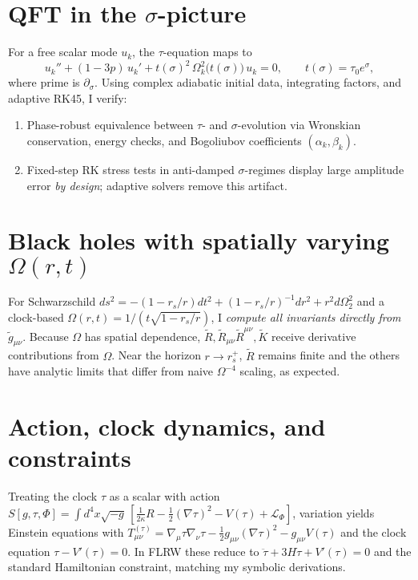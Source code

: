 \documentclass[aps,prd,onecolumn,superscriptaddress,nofootinbib]{revtex4-2}
\begin{document}
\section{QFT in the $\sigma$-picture}\label{sec:qft}
For a free scalar mode $u_k$, the $\tau$-equation maps to
\begin{equation}
u_k'' + (1-3p)\,u_k' + t(\sigma)^2\,\Omega_k^2\big(t(\sigma)\big)\,u_k=0,\qquad t(\sigma)=\tau_0 e^{\sigma},
\end{equation}
where prime is $\partial_\sigma$. Using complex adiabatic initial data, integrating factors, and adaptive RK45, I verify:
\begin{enumerate}
\item Phase-robust equivalence between $\tau$- and $\sigma$-evolution via Wronskian conservation, energy checks, and Bogoliubov coefficients $(\alpha_k,\beta_k)$.
\item Fixed-step RK stress tests in anti-damped $\sigma$-regimes display large amplitude error \emph{by design}; adaptive solvers remove this artifact.
\end{enumerate}

\section{Black holes with spatially varying $\Omega(r,t)$}\label{sec:schw}
For Schwarzschild $ds^2=-(1-r_s/r)dt^2+(1-r_s/r)^{-1}dr^2+r^2 d\Omega_2^2$ and a clock-based $\Omega(r,t)=1/(t\sqrt{1-r_s/r})$, I \emph{compute all invariants directly from} $\tilde g_{\mu\nu}$. Because $\Omega$ has spatial dependence, $ \tilde R, \tilde R_{\mu\nu}\tilde R^{\mu\nu}, \tilde K$ receive derivative contributions from $\Omega$. Near the horizon $r\to r_s^+$, $\tilde R$ remains finite and the others have analytic limits that differ from naive $\Omega^{-4}$ scaling, as expected.

\section{Action, clock dynamics, and constraints}\label{sec:action}
Treating the clock $\tau$ as a scalar with action $S[g,\tau,\Phi]=\int d^4x\sqrt{-g}\,[\frac{1}{2\kappa}R - \frac{1}{2}(\nabla \tau)^2 - V(\tau) + \mathcal{L}_\Phi]$, variation yields Einstein equations with $T^{(\tau)}_{\mu\nu}=\nabla_\mu\tau\nabla_\nu\tau - \frac{1}{2}g_{\mu\nu}(\nabla \tau)^2 - g_{\mu\nu}V(\tau)$ and the clock equation $\tau - V'(\tau)=0$. In FLRW these reduce to $\ddot \tau + 3H\dot \tau + V'(\tau)=0$ and the standard Hamiltonian constraint, matching my symbolic derivations.
\end{document}
